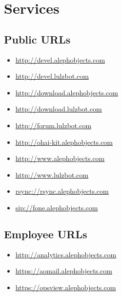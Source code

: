 \section{Services}
\subsection{Public URLs}
\begin{itemize}
\item \url{http://devel.alephobjects.com}
\item \url{http://devel.lulzbot.com}
\item \url{http://download.alephobjects.com}
\item \url{http://download.lulzbot.com}
\item \url{http://forum.lulzbot.com}
\item \url{http://ohai-kit.alephobjects.com}
\item \url{http://www.alephobjects.com}
\item \url{http://www.lulzbot.com}
\item \url{rsync://rsync.alephobjects.com}
\item \url{sip://fone.alephobjects.com}
\end{itemize}

\subsection{Employee URLs}
\begin{itemize}
\item \url{http://analytics.alephobjects.com}
\item \url{https://aomail.alephobjects.com}
\item \url{https://opsview.alephobjects.com}
\end{itemize}

